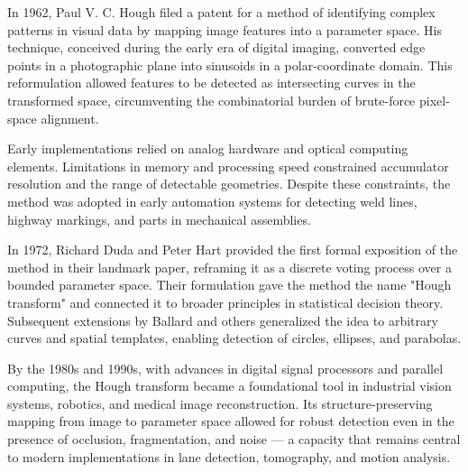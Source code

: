 
\begin{historical}
In 1962, Paul V. C. Hough filed a patent for a method of identifying complex patterns in visual data by mapping image features into a parameter space. His technique, conceived during the early era of digital imaging, converted edge points in a photographic plane into sinusoids in a polar-coordinate domain. This reformulation allowed features to be detected as intersecting curves in the transformed space, circumventing the combinatorial burden of brute-force pixel-space alignment.

Early implementations relied on analog hardware and optical computing elements. Limitations in memory and processing speed constrained accumulator resolution and the range of detectable geometries. Despite these constraints, the method was adopted in early automation systems for detecting weld lines, highway markings, and parts in mechanical assemblies.

In 1972, Richard Duda and Peter Hart provided the first formal exposition of the method in their landmark paper, reframing it as a discrete voting process over a bounded parameter space. Their formulation gave the method the name "Hough transform" and connected it to broader principles in statistical decision theory. Subsequent extensions by Ballard and others generalized the idea to arbitrary curves and spatial templates, enabling detection of circles, ellipses, and parabolas.

By the 1980s and 1990s, with advances in digital signal processors and parallel computing, the Hough transform became a foundational tool in industrial vision systems, robotics, and medical image reconstruction. Its structure-preserving mapping from image to parameter space allowed for robust detection even in the presence of occlusion, fragmentation, and noise  —  a capacity that remains central to modern implementations in lane detection, tomography, and motion analysis. 
\end{historical}